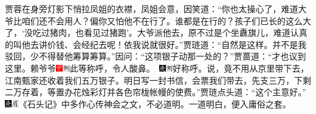 贾蓉在身旁灯影下悄拉凤姐的衣襟，凤姐会意，因笑道：``你也太操心了，难道大爷比咱们还不会用人？偏你又怕他不在行了。谁都是在行的？孩子们已长的这么大了，`没吃过猪肉，也看见过猪跑'。大爷派他去，原不过是个坐纛旗儿，难道认真的叫他去讲价钱、会经纪去呢！依我说就很好。''贾琏道：``自然是这样。并不是我驳回，少不得替他筹算筹算。''因问：``这项银子动那一处的？''贾蔷道：``才也议到这里。赖爷爷{\includegraphics[width=3mm]{../Images/00002}\includegraphics[width=3mm]{../Images/00011}\footnotesize \kaishu 此等称呼，令人酸鼻。　\includegraphics[width=3mm]{../Images/00004}\includegraphics[width=3mm]{../Images/00011}\footnotesize \kaishu 好称呼。}说，竟不用从京里带下去，江南甄家还收着我们五万银子。明日写一封书信，会票我们带去，先支三万，下剩二万存着，等置办花烛彩灯并各色帘栊帐幔的使费。''贾琏点头道：``这个主意好。''{\includegraphics[width=3mm]{../Images/00004}\includegraphics[width=3mm]{../Images/00010}\footnotesize \kaishu 《石头记》中多作心传神会之文，不必道明。一道明白，便入庸俗之套。}

